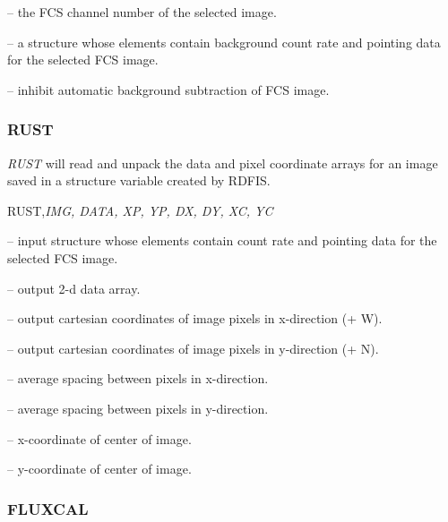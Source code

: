 {{{

 -- the FCS channel number of the selected image.

 -- a structure whose elements contain background count
rate and pointing data for the selected FCS image.


 -- inhibit automatic background subtraction of FCS image.

\subsubsection{RUST}

{\em RUST} will read and unpack the data and pixel  coordinate arrays for an
image saved in a structure variable created by RDFIS.


\noindent RUST,{\it IMG, DATA, XP, YP, DX, DY, XC, YC}


 -- input structure whose elements contain count
rate and pointing data for the selected FCS image.

 -- output 2-d data array.

 -- output cartesian coordinates of image pixels in
x-direction (+ W).

 -- output cartesian coordinates of image pixels in
y-direction (+ N).


 -- average spacing between pixels in x-direction.

 -- average spacing between pixels in y-direction.

 -- x-coordinate of center of image.

 -- y-coordinate of center of image.


\subsubsection{FLUXCAL}

}}}
